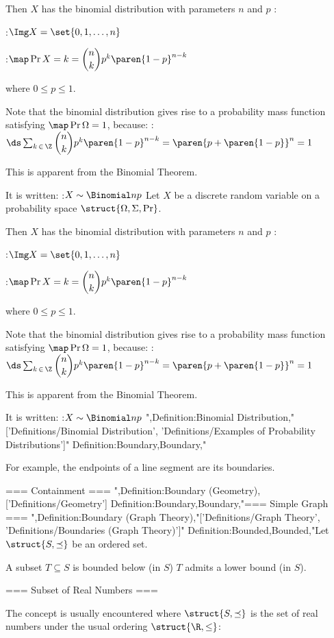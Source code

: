 Then $X$ has the binomial distribution with parameters $n$ and $p$ :

:$\Img X = \set {0, 1, \ldots, n}$

:$\map \Pr {X = k} = \dbinom n k p^k \paren {1 - p}^{n - k}$

where $0 \le p \le 1$.


Note that the binomial distribution gives rise to a probability mass function satisfying $\map \Pr \Omega = 1$, because:
:$\ds \sum_{k \mathop \in \Z} \dbinom n k p^k \paren {1 - p}^{n - k} = \paren {p + \paren {1 - p} }^n = 1$

This is apparent from the Binomial Theorem.


It is written:
:$X \sim \Binomial n p$
Let $X$ be a discrete random variable on a probability space $\struct {\Omega, \Sigma, \Pr}$.


Then $X$ has the binomial distribution with parameters $n$ and $p$ :

:$\Img X = \set {0, 1, \ldots, n}$

:$\map \Pr {X = k} = \dbinom n k p^k \paren {1 - p}^{n - k}$

where $0 \le p \le 1$.


Note that the binomial distribution gives rise to a probability mass function satisfying $\map \Pr \Omega = 1$, because:
:$\ds \sum_{k \mathop \in \Z} \dbinom n k p^k \paren {1 - p}^{n - k} = \paren {p + \paren {1 - p} }^n = 1$

This is apparent from the Binomial Theorem.


It is written:
:$X \sim \Binomial n p$
",Definition:Binomial Distribution,"['Definitions/Binomial Distribution', 'Definitions/Examples of Probability Distributions']"
Definition:Boundary,Boundary,"

For example, the endpoints of a line segment are its boundaries.


=== Containment ===
",Definition:Boundary (Geometry),['Definitions/Geometry']
Definition:Boundary,Boundary,"=== Simple Graph ===
",Definition:Boundary (Graph Theory),"['Definitions/Graph Theory', 'Definitions/Boundaries (Graph Theory)']"
Definition:Bounded,Bounded,"Let $\struct {S, \preceq}$ be an ordered set.


A subset $T \subseteq S$ is bounded below (in $S$)  $T$ admits a lower bound (in $S$).


=== Subset of Real Numbers ===

The concept is usually encountered where $\struct {S, \preceq}$ is the set of real numbers under the usual ordering $\struct {\R, \le}$:


